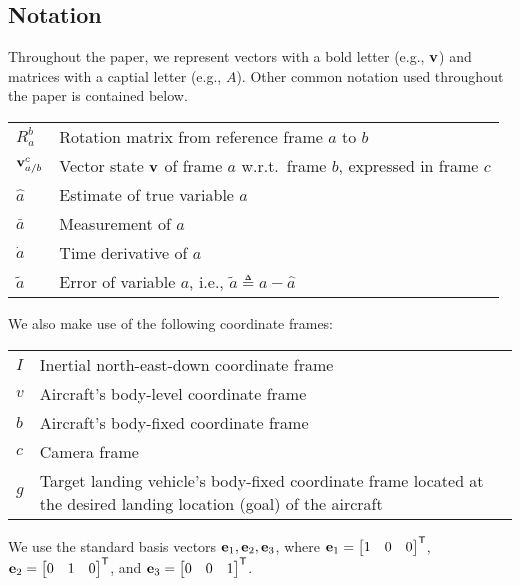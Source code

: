 
\subsection{Notation}

Throughout the paper, we represent vectors with a bold letter (e.g., $\bf v$)
and matrices with a captial letter (e.g., $A$). Other common notation used
throughout the paper is contained below.
\begin{center}
\begin{tabularx}{\columnwidth}{lX}
$R_a^b$ & Rotation matrix from reference frame $a$ to $b$ \\
$\boldsymbol{\mathrm{v}}_{a/b}^c$ & Vector state $\boldsymbol{\mathrm{v}}$ of frame $a$ w.r.t.~frame $b$, expressed in frame $c$ \\
$\hat{a}$ & Estimate of true variable $a$ \\
$\bar{a}$ & Measurement of $a$ \\
$\dot{a}$ & Time derivative of $a$ \\
$\tilde{a}$ & Error of variable $a$, i.e., $\tilde{a} \triangleq a - \hat{a}$
\end{tabularx}
\end{center}
%
We also make use of the following coordinate frames:
\begin{center}
\begin{tabularx}{\columnwidth}{lX}
$I$ & Inertial north-east-down coordinate frame\\
$v$ & Aircraft's body-level coordinate frame \\
$b$ & Aircraft's body-fixed coordinate frame \\
$c$ & Camera frame \\
$g$ & Target landing vehicle's body-fixed coordinate frame located at the desired
landing location (goal) of the aircraft
\end{tabularx}
\end{center}
%
We use the standard basis vectors $\boldsymbol{\mathrm{e}}_1, \boldsymbol{\mathrm{e}}_2, \boldsymbol{\mathrm{e}}_3$,
where $\boldsymbol{\mathrm{e}}_1 = \begin{bmatrix} 1 & 0 & 0 \end{bmatrix}^{\mathsf{T}}$,
$\boldsymbol{\mathrm{e}}_2 = \begin{bmatrix} 0 & 1 & 0 \end{bmatrix}^{\mathsf{T}}$,
and $\boldsymbol{\mathrm{e}}_3 = \begin{bmatrix} 0 & 0 & 1 \end{bmatrix}^{\mathsf{T}}$.
